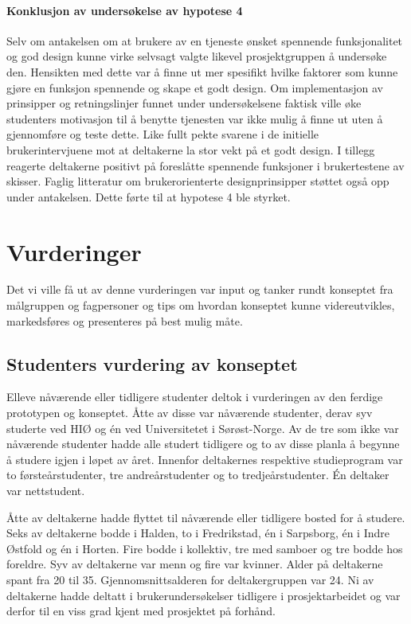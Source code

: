 \paragraph{Konklusjon av undersøkelse av hypotese 4}
Selv om antakelsen om at brukere av en tjeneste ønsket spennende funksjonalitet og god design kunne virke selvsagt valgte likevel prosjektgruppen å undersøke den. Hensikten med dette var å finne ut mer spesifikt hvilke faktorer som kunne gjøre en funksjon spennende og skape et godt design. Om implementasjon av prinsipper og retningslinjer funnet under undersøkelsene faktisk ville øke studenters motivasjon til å benytte tjenesten var ikke mulig å finne ut uten å gjennomføre og teste dette. Like fullt pekte svarene i de initielle brukerintervjuene mot at deltakerne la stor vekt på et godt design. I tillegg reagerte deltakerne positivt på foreslåtte spennende funksjoner i brukertestene av skisser. Faglig litteratur om brukerorienterte designprinsipper støttet også opp under antakelsen. Dette førte til at hypotese 4 ble styrket.


\section{Vurderinger}

Det vi ville få ut av denne vurderingen var input og tanker rundt konseptet fra målgruppen og fagpersoner og tips om hvordan konseptet kunne videreutvikles, markedsføres og presenteres på best mulig måte.

\subsection{Studenters vurdering av konseptet}
Elleve nåværende eller tidligere studenter deltok i vurderingen av den ferdige prototypen og konseptet. Åtte av disse var nåværende studenter, derav syv studerte ved HIØ og én ved Universitetet i Sørøst-Norge. Av de tre som ikke var nåværende studenter hadde alle studert tidligere og to av disse planla å begynne å studere igjen i løpet av året. Innenfor deltakernes respektive studieprogram var to førsteårstudenter, tre andreårstudenter og to tredjeårstudenter. Én deltaker var nettstudent.

Åtte av deltakerne hadde flyttet til nåværende eller tidligere bosted for å studere. Seks av deltakerne bodde i Halden, to i Fredrikstad, én i Sarpsborg, én i Indre Østfold og én i Horten. Fire bodde i kollektiv, tre med samboer og tre bodde hos foreldre. Syv av deltakerne var menn og fire var kvinner. Alder på deltakerne spant fra 20 til 35. Gjennomsnittsalderen for deltakergruppen var 24. Ni av deltakerne hadde deltatt i brukerundersøkelser tidligere i prosjektarbeidet og var derfor til en viss grad kjent med prosjektet på forhånd.

